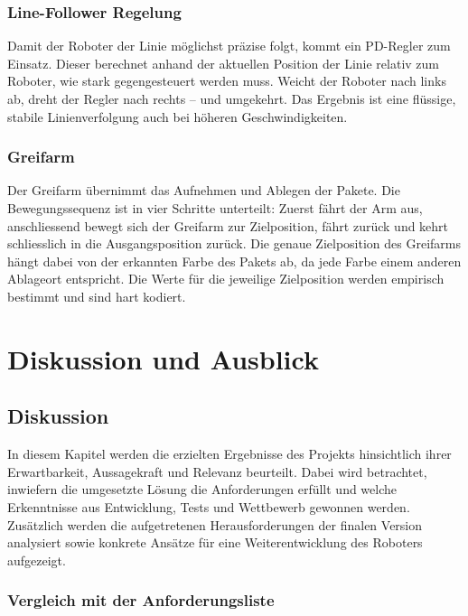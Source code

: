 \documentclass[11pt,a4paper]{article}
\begin{document}
	
	\subsubsection{Line-Follower Regelung}
	
	Damit der Roboter der Linie möglichst präzise folgt, kommt ein PD-Regler zum 
	Einsatz. Dieser berechnet anhand der aktuellen Position der Linie relativ zum Roboter, 
	wie stark gegengesteuert werden muss. Weicht der Roboter nach links ab, dreht der 
	Regler nach rechts -- und umgekehrt. Das Ergebnis ist eine flüssige, stabile 
	Linienverfolgung auch bei höheren Geschwindigkeiten.
	
	
	\subsubsection{Greifarm}
	
	Der Greifarm übernimmt das Aufnehmen und Ablegen der Pakete. Die Bewegungssequenz 
	ist in vier Schritte unterteilt: Zuerst fährt der 
	Arm aus, anschliessend bewegt sich der Greifarm zur Zielposition, fährt zurück und 
	kehrt schliesslich in die Ausgangsposition zurück. Die genaue Zielposition des 
	Greifarms hängt dabei von der erkannten Farbe des Pakets ab, da jede Farbe einem 
	anderen Ablageort entspricht. Die Werte für die jeweilige Zielposition werden empirisch bestimmt und sind hart kodiert.
	
	\newpage
	\section{Diskussion und Ausblick}
	
	\subsection{Diskussion}
	
	In diesem Kapitel werden die erzielten Ergebnisse des Projekts hinsichtlich ihrer Erwartbarkeit, Aussagekraft und Relevanz beurteilt. Dabei wird betrachtet, inwiefern die umgesetzte Lösung die Anforderungen erfüllt und welche Erkenntnisse aus Entwicklung, Tests und Wettbewerb gewonnen werden. Zusätzlich werden die aufgetretenen Herausforderungen der finalen Version analysiert sowie konkrete Ansätze für eine Weiterentwicklung des Roboters aufgezeigt.
	
	\subsubsection{Vergleich mit der Anforderungsliste}
	
\end{document}
